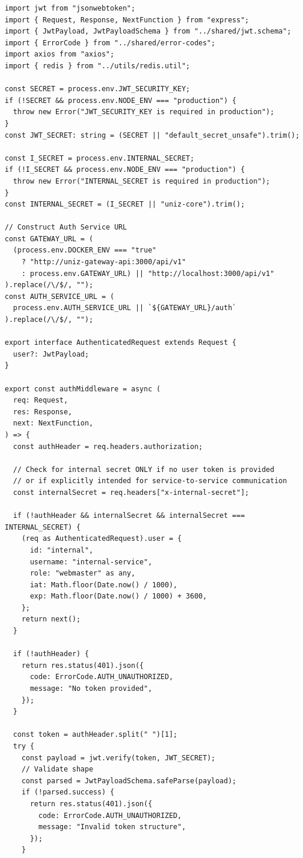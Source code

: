 \documentclass[11pt,a4paper,oneside]{article}
\begin{document}
\begin{lstlisting}
import jwt from "jsonwebtoken";
import { Request, Response, NextFunction } from "express";
import { JwtPayload, JwtPayloadSchema } from "../shared/jwt.schema";
import { ErrorCode } from "../shared/error-codes";
import axios from "axios";
import { redis } from "../utils/redis.util";

const SECRET = process.env.JWT_SECURITY_KEY;
if (!SECRET && process.env.NODE_ENV === "production") {
  throw new Error("JWT_SECURITY_KEY is required in production");
}
const JWT_SECRET: string = (SECRET || "default_secret_unsafe").trim();

const I_SECRET = process.env.INTERNAL_SECRET;
if (!I_SECRET && process.env.NODE_ENV === "production") {
  throw new Error("INTERNAL_SECRET is required in production");
}
const INTERNAL_SECRET = (I_SECRET || "uniz-core").trim();

// Construct Auth Service URL
const GATEWAY_URL = (
  (process.env.DOCKER_ENV === "true"
    ? "http://uniz-gateway-api:3000/api/v1"
    : process.env.GATEWAY_URL) || "http://localhost:3000/api/v1"
).replace(/\/$/, "");
const AUTH_SERVICE_URL = (
  process.env.AUTH_SERVICE_URL || `${GATEWAY_URL}/auth`
).replace(/\/$/, "");

export interface AuthenticatedRequest extends Request {
  user?: JwtPayload;
}

export const authMiddleware = async (
  req: Request,
  res: Response,
  next: NextFunction,
) => {
  const authHeader = req.headers.authorization;

  // Check for internal secret ONLY if no user token is provided
  // or if explicitly intended for service-to-service communication
  const internalSecret = req.headers["x-internal-secret"];

  if (!authHeader && internalSecret && internalSecret === INTERNAL_SECRET) {
    (req as AuthenticatedRequest).user = {
      id: "internal",
      username: "internal-service",
      role: "webmaster" as any,
      iat: Math.floor(Date.now() / 1000),
      exp: Math.floor(Date.now() / 1000) + 3600,
    };
    return next();
  }

  if (!authHeader) {
    return res.status(401).json({
      code: ErrorCode.AUTH_UNAUTHORIZED,
      message: "No token provided",
    });
  }

  const token = authHeader.split(" ")[1];
  try {
    const payload = jwt.verify(token, JWT_SECRET);
    // Validate shape
    const parsed = JwtPayloadSchema.safeParse(payload);
    if (!parsed.success) {
      return res.status(401).json({
        code: ErrorCode.AUTH_UNAUTHORIZED,
        message: "Invalid token structure",
      });
    }


\end{lstlisting}
\end{document}
